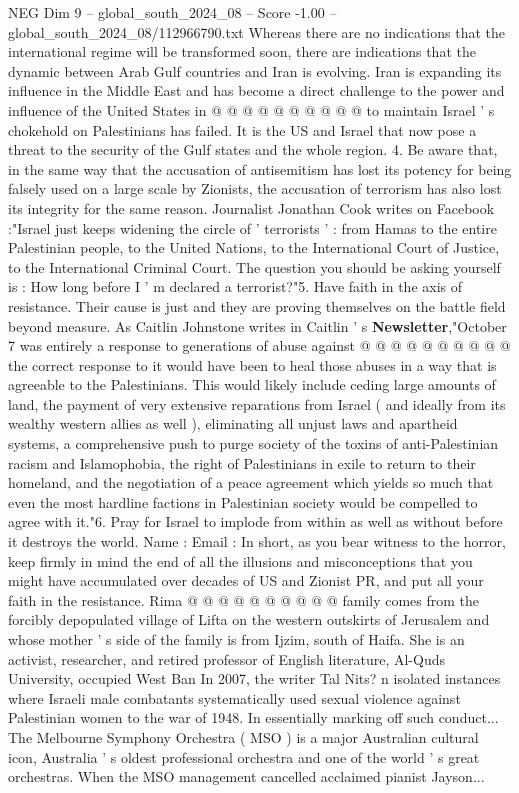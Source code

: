 \begin{textsample}{NEG Dim 9 – global\_south\_2024\_08 – Score -1.00 – global\_south\_2024\_08/112966790.txt}
Whereas there are no indications that the international regime will be transformed soon, there are indications that the dynamic between Arab Gulf countries and Iran is evolving.
Iran is expanding its influence in the Middle East and has become a direct challenge to the power and influence of the United States in @ @ @ @ @ @ @ @ @ @ to maintain Israel ' s chokehold on Palestinians has failed.
It is the US and Israel that now pose a threat to the security of the Gulf states and the whole region. 4.
Be aware that, in the same way that the accusation of antisemitism has lost its potency for being falsely used on a large scale by Zionists, the accusation of terrorism has also lost its integrity for the same reason.
Journalist Jonathan Cook writes on Facebook :"Israel just keeps widening the circle of ' terrorists ' : from Hamas to the entire Palestinian people, to the United Nations, to the International Court of Justice, to the International Criminal Court.
The question you should be asking yourself is : How long before I ' m declared a terrorist?"5.
Have faith in the axis of resistance.
Their cause is just and they are proving themselves on the battle field beyond measure.
As Caitlin Johnstone writes in Caitlin ' s \textbf{Newsletter},"October 7 was entirely a response to generations of abuse against @ @ @ @ @ @ @ @ @ @ the correct response to it would have been to heal those abuses in a way that is agreeable to the Palestinians.
This would likely include ceding large amounts of land, the payment of very extensive reparations from Israel ( and ideally from its wealthy western allies as well ), eliminating all unjust laws and apartheid systems, a comprehensive push to purge society of the toxins of anti-Palestinian racism and Islamophobia, the right of Palestinians in exile to return to their homeland, and the negotiation of a peace agreement which yields so much that even the most hardline factions in Palestinian society would be compelled to agree with it."6.
Pray for Israel to implode from within as well as without before it destroys the world.
Name : Email : In short, as you bear witness to the horror, keep firmly in mind the end of all the illusions and misconceptions that you might have accumulated over decades of US and Zionist PR, and put all your faith in the resistance.
Rima @ @ @ @ @ @ @ @ @ @ family comes from the forcibly depopulated village of Lifta on the western outskirts of Jerusalem and whose mother ' s side of the family is from Ijzim, south of Haifa.
She is an activist, researcher, and retired professor of English literature, Al-Quds University, occupied West Ban In 2007, the writer Tal Nits? n isolated instances where Israeli male combatants systematically used sexual violence against Palestinian women to the war of 1948.
In essentially marking off such conduct...
The Melbourne Symphony Orchestra ( MSO ) is a major Australian cultural icon, Australia ' s oldest professional orchestra and one of the world ' s great orchestras.
When the MSO management cancelled acclaimed pianist Jayson...

\end{textsample}
